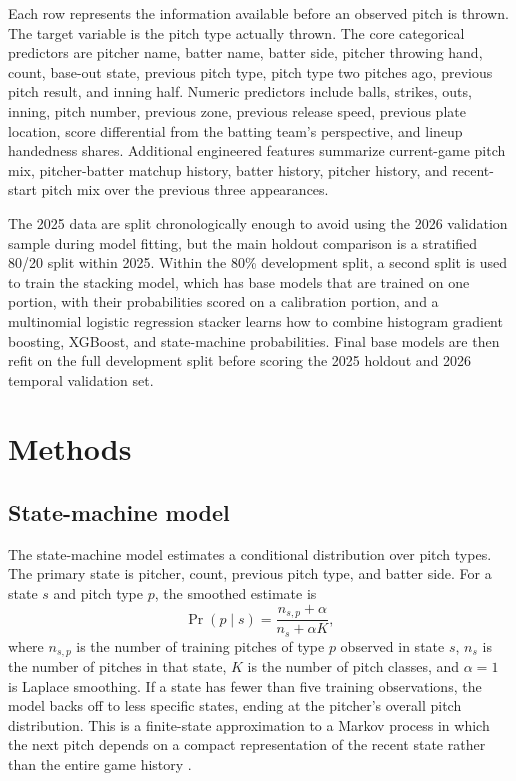 \documentclass[9pt,twoside]{pnas-new}
\begin{document}
Each row represents the information available before an observed pitch is thrown. The target variable is the pitch type actually thrown. The core categorical predictors are pitcher name, batter name, batter side, pitcher throwing hand, count, base-out state, previous pitch type, pitch type two pitches ago, previous pitch result, and inning half. Numeric predictors include balls, strikes, outs, inning, pitch number, previous zone, previous release speed, previous plate location, score differential from the batting team's perspective, and lineup handedness shares. Additional engineered features summarize current-game pitch mix, pitcher-batter matchup history, batter history, pitcher history, and recent-start pitch mix over the previous three appearances.

The 2025 data are split chronologically enough to avoid using the 2026 validation sample during model fitting, but the main holdout comparison is a stratified 80/20 split within 2025. Within the 80\% development split, a second split is used to train the stacking model, which has base models that are trained on one portion, with their probabilities scored on a calibration portion, and a multinomial logistic regression stacker learns how to combine histogram gradient boosting, XGBoost, and state-machine probabilities. Final base models are then refit on the full development split before scoring the 2025 holdout and 2026 temporal validation set.

\section*{Methods}

\subsection*{State-machine model}

The state-machine model estimates a conditional distribution over pitch types. The primary state is pitcher, count, previous pitch type, and batter side. For a state $s$ and pitch type $p$, the smoothed estimate is
\begin{equation}
\Pr(p \mid s)=\frac{n_{s,p}+\alpha}{n_s+\alpha K},
\end{equation}
where $n_{s,p}$ is the number of training pitches of type $p$ observed in state $s$, $n_s$ is the number of pitches in that state, $K$ is the number of pitch classes, and $\alpha=1$ is Laplace smoothing. If a state has fewer than five training observations, the model backs off to less specific states, ending at the pitcher's overall pitch distribution. This is a finite-state approximation to a Markov process in which the next pitch depends on a compact representation of the recent state rather than the entire game history \cite{norris1998markov}.
\end{document}
